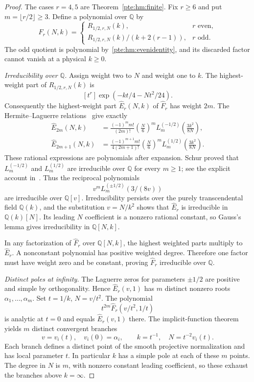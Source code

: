 \documentclass[11pt,a4paper]{article}
\numberwithin{equation}{section}
\theoremstyle{definition}
\theoremstyle{plain}
\begin{document}
\begin{proof}
The cases $r=4,5$ are Theorem~\ref{pte:hm:finite}. Fix $r\ge6$ and put $m=\lfloor r/2\rfloor\ge3$. Define a polynomial over $\mathbb Q$ by
\[
 \widehat F_r(N,k)=
 \begin{cases}
 R_{1/2,r,N}(k),&r\text{ even},\\
 R_{1/2,r,N}(k)/(k+2(r-1)),&r\text{ odd}.
 \end{cases}
\]
The odd quotient is polynomial by~\eqref{pte:hm:evenidentity}, and its discarded factor cannot vanish at a physical $k\ge0$.

\emph{Irreducibility over $\mathbb Q$.}
Assign weight two to $N$ and weight one to $k$. The highest-weight part of $R_{1/2,r,N}(k)$ is
\[
 [t^r]\exp(-kt/4-Nt^2/24).
\]
Consequently the highest-weight part $\widehat E_r(N,k)$ of $\widehat F_r$ has weight $2m$. The Hermite--Laguerre relations~\cite{pte-dlmf18} give exactly
\begin{align}
 \widehat E_{2m}(N,k)
 &=\frac{(-1)^m m!}{(2m)!}
       \left(\frac N6\right)^m
       L_m^{(-1/2)}\left(\frac{3k^2}{8N}\right),\label{pte:hm:evenedge}\\
 \widehat E_{2m+1}(N,k)
 &=\frac{(-1)^{m+1}m!}{4(2m+1)!}
       \left(\frac N6\right)^m
       L_m^{(1/2)}\left(\frac{3k^2}{8N}\right).\label{pte:hm:oddedge}
\end{align}
These rational expressions are polynomials after expansion. Schur proved that $L_m^{(-1/2)}$ and $L_m^{(1/2)}$ are irreducible over $\mathbb Q$ for every $m\ge1$; see the explicit account in~\cite[pp.~1--2]{pte-schur}. Thus the reciprocal polynomials
\[
 v^mL_m^{(\pm1/2)}(3/(8v))
\]
are irreducible over $\mathbb Q[v]$. Irreducibility persists over the purely transcendental field $\mathbb Q(k)$, and the substitution $v=N/k^2$ shows that $\widehat E_r$ is irreducible in $\mathbb Q(k)[N]$. Its leading $N$ coefficient is a nonzero rational constant, so Gauss's lemma gives irreducibility in $\mathbb Q[N,k]$.

In any factorization of $\widehat F_r$ over $\mathbb Q[N,k]$, the highest weighted parts multiply to $\widehat E_r$. A nonconstant polynomial has positive weighted degree. Therefore one factor must have weight zero and be constant, proving $\widehat F_r$ irreducible over $\mathbb Q$.

\emph{Distinct poles at infinity.}
The Laguerre zeros for parameters $\pm1/2$ are positive and simple by orthogonality. Hence $\widehat E_r(v,1)$ has $m$ distinct nonzero roots $\alpha_1,\ldots,\alpha_m$. Set $t=1/k$, $N=v/t^2$. The polynomial
\[
 t^{2m}\widehat F_r(v/t^2,1/t)
\]
is analytic at $t=0$ and equals $\widehat E_r(v,1)$ there. The implicit-function theorem yields $m$ distinct convergent branches
\begin{equation}\label{pte:hm:infinity}
 v=v_i(t),\quad v_i(0)=\alpha_i,\qquad
 k=t^{-1},\quad N=t^{-2}v_i(t).
\end{equation}
Each branch defines a distinct point of the smooth projective normalization and has local parameter $t$. In particular $k$ has a simple pole at each of these $m$ points. The degree in $N$ is $m$, with nonzero constant leading coefficient, so these exhaust the branches above $k=\infty$.


\end{proof}
\end{document}

